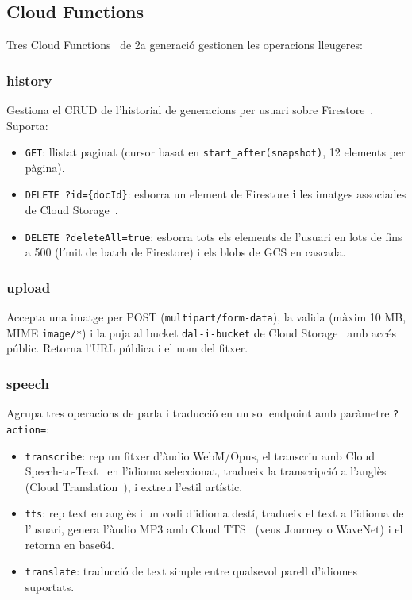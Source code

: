 \subsection{Cloud Functions}

Tres Cloud Functions~\cite{cloudfunctions} de 2a generació gestionen les operacions lleugeres:

\subsubsection*{history}
Gestiona el CRUD de l'historial de generacions per usuari sobre Firestore~\cite{firestore}. Suporta:
\begin{itemize}
  \item \texttt{GET}: llistat paginat (cursor basat en \texttt{start\_after(snapshot)}, 12 elements per pàgina).
  \item \texttt{DELETE ?id=\{docId\}}: esborra un element de Firestore \textbf{i} les imatges associades de Cloud Storage~\cite{gcs}.
  \item \texttt{DELETE ?deleteAll=true}: esborra tots els elements de l'usuari en lots de fins a 500 (límit de batch de Firestore) i els blobs de GCS en cascada.
\end{itemize}

\subsubsection*{upload}
Accepta una imatge per POST (\texttt{multipart/form-data}), la valida (màxim 10 MB, MIME \texttt{image/*}) i la puja al bucket \texttt{dal-i-bucket} de Cloud Storage~\cite{gcs} amb accés públic. Retorna l'URL pública i el nom del fitxer.

\subsubsection*{speech}
Agrupa tres operacions de parla i traducció en un sol endpoint amb paràmetre \texttt{?action=}:
\begin{itemize}
  \item \texttt{transcribe}: rep un fitxer d'àudio WebM/Opus, el transcriu amb Cloud Speech-to-Text~\cite{stt} en l'idioma seleccionat, tradueix la transcripció a l'anglès (Cloud Translation~\cite{translate}), i extreu l'estil artístic.
  \item \texttt{tts}: rep text en anglès i un codi d'idioma destí, tradueix el text a l'idioma de l'usuari, genera l'àudio MP3 amb Cloud TTS~\cite{tts} (veus Journey o WaveNet) i el retorna en base64.
  \item \texttt{translate}: traducció de text simple entre qualsevol parell d'idiomes suportats.
\end{itemize}

